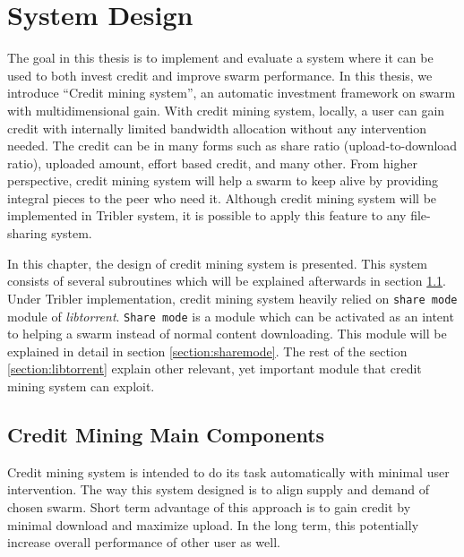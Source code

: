 \chapter{System Design}
\label{chp:design}

The goal in this thesis is to implement and evaluate a system where it can be used to both invest credit and improve swarm performance. In this thesis, we introduce ``Credit mining system'', an automatic investment framework on swarm with multidimensional gain. With credit mining system, locally, a user can gain credit with internally limited bandwidth allocation without any intervention needed. The credit can be in many forms such as share ratio (upload-to-download ratio), uploaded amount, effort based credit, and many other. From higher perspective, credit mining system will help a swarm to keep alive by providing integral pieces to the peer who need it. Although credit mining system will be implemented in Tribler system, it is possible to apply this feature to any file-sharing system.

In this chapter, the design of credit mining system is presented. This system consists of several subroutines which will be explained afterwards in section \ref{section:cmcomponents}. Under Tribler implementation, credit mining system heavily relied on \texttt{share mode} module of \textit{libtorrent}. \texttt{Share mode} is a module which can be activated as an intent to helping a swarm instead of normal content downloading. This module will be explained in detail in section \ref{section:sharemode}. The rest of the section \ref{section:libtorrent} explain other relevant, yet important module that credit mining system can exploit.

\section{Credit Mining Main Components}
\label{section:cmcomponents}

Credit mining system is intended to do its task automatically with minimal user intervention. The way this system designed is to align supply and demand of chosen swarm. Short term advantage of this approach is to gain credit by minimal download and maximize upload. In the long term, this potentially increase overall performance of other user as well.


